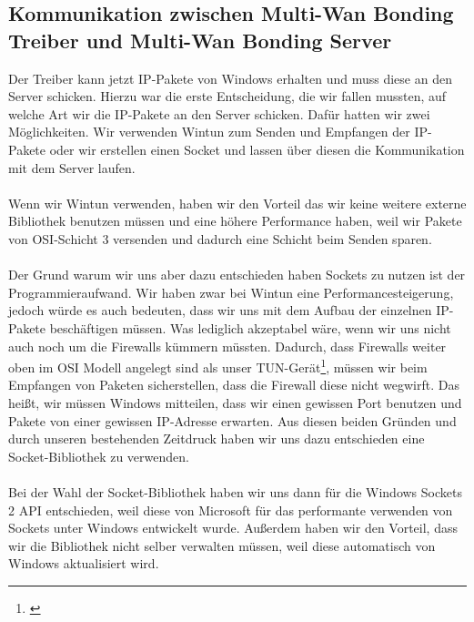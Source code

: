 \subsection{Kommunikation zwischen Multi-Wan Bonding Treiber und Multi-Wan Bonding Server}
Der Treiber kann jetzt IP-Pakete von Windows erhalten und muss diese an den Server schicken. Hierzu war die erste Entscheidung, die wir fallen mussten, auf welche Art wir die IP-Pakete an den Server schicken. Dafür hatten wir zwei Möglichkeiten. Wir verwenden Wintun zum Senden und Empfangen der IP-Pakete oder wir erstellen einen Socket und lassen über diesen die Kommunikation mit dem Server laufen.
\\\\
Wenn wir Wintun verwenden, haben wir den Vorteil das wir keine weitere externe Bibliothek benutzen müssen und eine höhere Performance haben, weil wir Pakete von OSI-Schicht 3 versenden und dadurch eine Schicht beim Senden sparen.
\\\\
Der Grund warum wir uns aber dazu entschieden haben Sockets zu nutzen ist der Programmieraufwand. Wir haben zwar bei Wintun eine Performancesteigerung, jedoch würde es auch bedeuten, dass wir uns mit dem Aufbau der einzelnen IP-Pakete beschäftigen müssen. Was lediglich akzeptabel wäre, wenn wir uns nicht auch noch um die Firewalls kümmern müssten. Dadurch, dass Firewalls weiter oben im OSI Modell angelegt sind als unser TUN-Gerät\footnote[1]{\cite[Vgl.][]{8}}, müssen wir beim Empfangen von Paketen sicherstellen, dass die Firewall diese nicht wegwirft. Das heißt, wir müssen Windows mitteilen, dass wir einen gewissen Port benutzen und Pakete von einer gewissen IP-Adresse erwarten. Aus diesen beiden Gründen und durch unseren bestehenden Zeitdruck haben wir uns dazu entschieden eine Socket-Bibliothek zu verwenden.
\\\\
Bei der Wahl der Socket-Bibliothek haben wir uns dann für die Windows Sockets 2 API entschieden, weil diese von Microsoft für das performante verwenden von Sockets unter Windows entwickelt wurde. Außerdem haben wir den Vorteil, dass wir die Bibliothek nicht selber verwalten müssen, weil diese automatisch von Windows aktualisiert wird.

